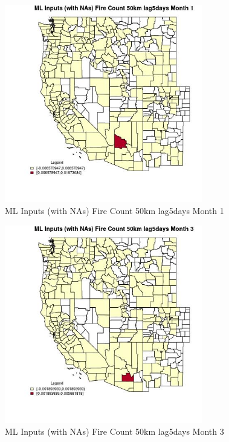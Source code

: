 \begin{figure} 
\centering  
\includegraphics[width=0.77\textwidth]{Code_Outputs/Report_ML_input_PM25_Step4_part_e_de_duplicated_aves_compiled_2019-05-21wNAs_CountyFire_Count_50km_lag5daysmedianMonth1.jpg} 
\caption{\label{fig:Report_ML_input_PM25_Step4_part_e_de_duplicated_aves_compiled_2019-05-21wNAsCountyFire_Count_50km_lag5daysmedianMonth1}ML Inputs (with NAs) Fire Count 50km lag5days Month 1} 
\end{figure} 
 

\begin{figure} 
\centering  
\includegraphics[width=0.77\textwidth]{Code_Outputs/Report_ML_input_PM25_Step4_part_e_de_duplicated_aves_compiled_2019-05-21wNAs_CountyFire_Count_50km_lag5daysmedianMonth3.jpg} 
\caption{\label{fig:Report_ML_input_PM25_Step4_part_e_de_duplicated_aves_compiled_2019-05-21wNAsCountyFire_Count_50km_lag5daysmedianMonth3}ML Inputs (with NAs) Fire Count 50km lag5days Month 3} 
\end{figure} 
 

